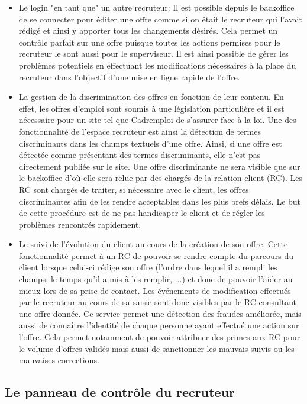 \begin{itemize}
  \item Le login "en tant que" un autre recruteur:
  Il est possible depuis le backoffice de se connecter pour éditer une offre comme si on était le recruteur qui l'avait rédigé et ainsi y apporter tous les changements désirés.
  Cela permet un contrôle parfait sur une offre puisque toutes les actions permises pour le recruteur le sont aussi pour le superviseur.
  Il est ainsi possible de gérer les problèmes potentiels en effectuant les modifications nécessaires à la place du recruteur dans l'objectif d'une mise en ligne rapide de l'offre.
  \item La gestion de la discrimination des offres en fonction de leur contenu.
  En effet, les offres d'emploi sont soumis à une législation particulière et il est nécessaire pour un site tel que Cadremploi de s'assurer face à la loi.
  Une des fonctionnalité de l'espace recruteur est ainsi la détection de termes discriminants dans les champs textuels d'une offre.
  Ainsi, si une offre est détectée comme présentant des termes discriminants, elle n'est pas directement publiée sur le site.
  Une offre discriminante ne sera visible que sur le backoffice d'où elle sera relue par des chargés de la relation client (RC).
  Les RC sont chargés de traiter, si nécessaire avec le client, les offres discriminantes afin de les rendre acceptables dans les plus brefs délais.
  Le but de cette procédure est de ne pas handicaper le client et de régler les problèmes rencontrés rapidement.
  \item Le suivi de l'évolution du client au cours de la création de son offre.
  Cette fonctionnalité permet à un RC de pouvoir se rendre compte du parcours du client lorsque celui-ci rédige son offre (l'ordre dans lequel il a rempli les champs, le temps qu'il a mis à les remplir, ...) et donc de pouvoir l'aider au mieux lors de sa prise de contact.
  Les événements de modification effectués par le recruteur au cours de sa saisie sont donc visibles par le RC consultant une offre donnée.
  Ce service permet une détection des fraudes améliorée, mais aussi de connaître l'identité de chaque personne ayant effectué une action sur l'offre.
  Cela permet notamment de pouvoir attribuer des primes aux RC pour le volume d'offres validés mais aussi de sanctionner les mauvais suivis ou les mauvaises corrections.
\end{itemize}

\subsection{Le panneau de contrôle du recruteur}
